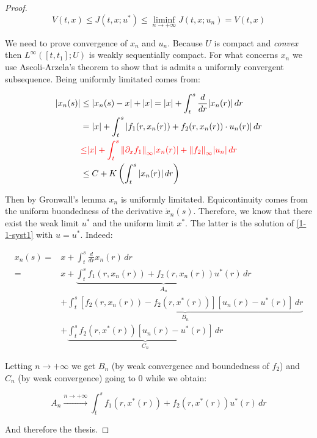 \begin{theorem}
\begin{proof}
        \[V(t,x)\leq J(t,x;u^{\ast}) \leq \liminf_{n\to+\infty} J(t,x;u_n) = V(t,x)\]

        We need to prove convergence of $x_n$ and $u_n$. Because $U$ is compact and \textit{convex} then $L^{\infty}([t,t_1];U)$ is 
        weakly sequentially compact. For what concerns $x_n$ we use Ascoli-Arzela's theorem to show that is admits a uniformly convergent subsequence. Being 
        uniformly limitated comes from:

        \begin{align}
            \abs{x_n(s)} & \leq \abs{x_n(s)-x}+\abs{x} = \abs{x} + \int_t^s \frac{d}{dr}\abs{x_n(r)} \,dr \\
            & = \abs{x} + \int_t^s \abs{f_1(r,x_n(r)) + f_2(r,x_n(r))\cdot u_n(r)}\,dr \\
            & \color{red}{\leq} \abs{x} + \int_t^s \norm{\partial_xf_1}_{\infty}\abs{x_n(r)} + \norm{f_2}_{\infty}\abs{u_n} \,dr \\
            & \leq C + K\left( \int_t^s \abs{x_n(r)} \,dr \right)   
        \end{align}

        Then by Gronwall's lemma $x_n$ is uniformly limitated. Equicontinuity comes from the uniform buondedness of the
        derivative $\dot{x}_n(s)$. Therefore, we know that there exist the weak limit $u^{\ast}$ and the uniform
        limit $x^{\ast}$. The latter is the solution of \ref{1-1-syst1} with $u=u^{\ast}$. Indeed:

        \begin{align*}
                x_n(s) = & x + \int_t^s\frac{d}{dr}x_n(r) \,dr\\
                = & x + \underbrace{\int_t^sf_1(r,x_n(r)) + f_2(r,x_n(r))u^{\ast}(r) \,dr}_{A_n} \\ 
                & + \underbrace{\int_t^s \left[f_2(r,x_n(r)) - f_2(r,x^{\ast}(r))\right]\left[u_n(r)-u^{\ast}(r)\right] \,dr}_{B_n} \\
                & + \underbrace{\int_t^s f_2(r,x^{\ast}(r))\left[u_n(r)-u^{\ast}(r)\right] \,dr}_{C_n}
        \end{align*}
        
        Letting $n\to+\infty$ we get $B_n$ (by weak convergence and boundedness of $f_2$) and $C_n$ (by weak convergence) going to $0$ 
        while we obtain:

        \[A_n\xrightarrow{n\to+\infty}\int_t^sf_1(r,x^{\ast}(r))+f_2(r,x^{\ast}(r))u^{\ast}(r)\,dr\]
        
        And therefore the thesis.
    \end{proof}
\end{theorem}


